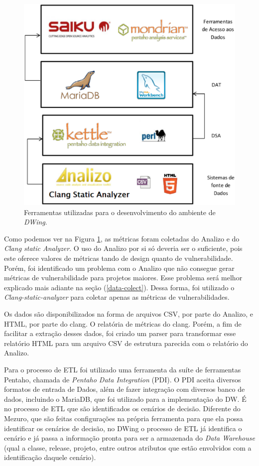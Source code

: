  \begin{figure}[!htb]
 	\centering
 		\includegraphics[scale=0.5]{figuras/dw_components}
 		\caption{Ferramentas utilizadas para o desenvolvimento do ambiente de \emph{DWing}.}
 		\label{dw_components}
 \end{figure}


Como podemos ver na Figura \ref{dw_components}, as métricas foram coletadas do Analizo e do \emph{Clang static Analyzer}. O uso do Analizo por si só deveria ser o suficiente, pois este oferece valores de métricas tando de design quanto de vulnerabilidade. Porém, foi identificado um problema com o Analizo que não consegue gerar métricas de vulnerabilidade para projetos maiores. Esse problema será melhor explicado mais adiante na seção (\ref{data-colect}). Dessa forma, foi utilizado o \emph{Clang-static-analyzer} para coletar apenas as métricas de vulnerabilidades.

%
Os dados são disponibilizados na forma de arquivos CSV, por parte do Analizo, e HTML, por parte do clang. O relatória de métricas do clang. Porém, a fim de facilitar a extração desses dados, foi criado um parser para transformar esse relatório HTML para um arquivo CSV de estrutura parecida com o relatório do Analizo.


Para o processo de ETL foi utilizado uma ferramenta da suíte de ferramentas Pentaho, chamada de \emph{Pentaho Data Integration} (PDI). O PDI aceita diversos formatos de entrada de Dados, além de fazer integração com diversos banco de dados, incluindo o MariaDB, que foi utilizado para a implementação do DW. É no processo de ETL que são identificados os cenários de decisão. Diferente do Mezuro, que são feitas configurações na própria ferramenta para que ela possa identificar os cenários de decisão, no DWing o processo de ETL já identifica o cenário e já passa a informação pronta para ser a armazenada do \emph{Data Warehouse} (qual a classe, release, projeto, entre outros atributos que estão envolvidos com a identificação daquele cenário).


